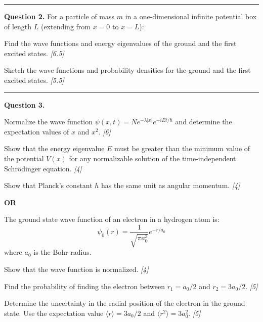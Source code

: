 \documentclass[11pt,a4paper]{article}
\newcommand{\pts}[1]{\hfill   \textit{[#1]}}
\begin{document}
\medskip\rule{\linewidth}{0.2pt}




\noindent   \textbf{Question 2.} For a particle of mass $m$ in a one-dimensional infinite potential box of length $L$ (extending from $x=0$ to $x=L$):

\begin{parts}
  \item Find the wave functions and energy eigenvalues of the ground and the first excited states. \pts{6.5}
  \item Sketch the wave functions and probability densities for the ground and the first excited states. \pts{5.5}
\end{parts}

\medskip\rule{\linewidth}{0.2pt}




\noindent   \textbf{Question 3.}

\begin{parts}
  \item Normalize the wave function $\psi(x,t) = N e^{-\lambda |x|} e^{-iEt/\hbar}$ and determine the expectation values of $x$ and $x^2$. \pts{6}
  \item Show that the energy eigenvalue $E$ must be greater than the minimum value of the potential $V(x)$ for any normalizable solution of the time-independent Schr\"{o}dinger equation. \pts{4}
  \item Show that Planck's constant $h$ has the same unit as angular momentum. \pts{4}
\end{parts}
\hfill   \textbf{OR}

\begin{parts}
  \item The ground state wave function of an electron in a hydrogen atom is:
    \[ \psi_0(r) = \frac{1}{\sqrt{\pi a_0^3}} e^{-r/a_0} \]
    where $a_0$ is the Bohr radius.
    
\begin{parts}
      \item Show that the wave function is normalized. \pts{4}
      \item Find the probability of finding the electron between $r_1 = a_0/2$ and $r_2 = 3a_0/2$. \pts{5}
      \item Determine the uncertainty in the radial position of the electron in the ground state. Use the expectation value $\langle r \rangle = 3a_0/2$ and $\langle r^2 \rangle = 3a_0^2$. \pts{5}
    \end{parts}
\end{parts}
\end{document}
